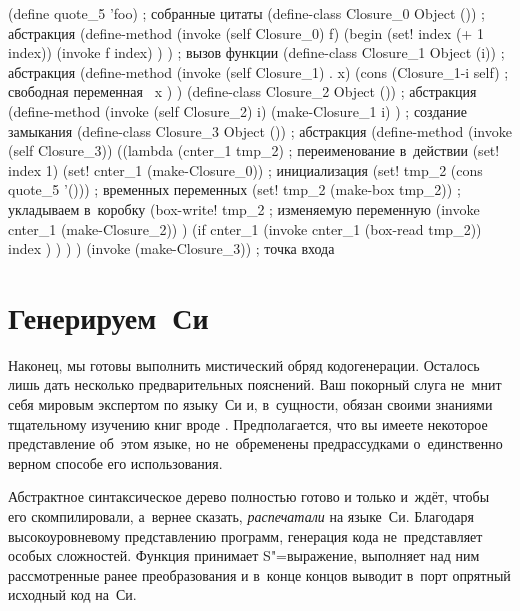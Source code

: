 \begin{code:lisp}
(define quote_5 'foo)                    ; собранные цитаты
(define-class Closure_0 Object ())       ; абстракция 
(define-method (invoke (self Closure_0) f)
  (begin
    (set! index (+ 1 index))
    (invoke f index) ) )                 ; вызов функции
(define-class Closure_1 Object (i))      ; абстракция 
(define-method (invoke (self Closure_1) . x)
  (cons (Closure_1-i self)               ; свободная переменная~
        x ) )
(define-class Closure_2 Object ())       ; абстракция 
(define-method (invoke (self Closure_2) i)
  (make-Closure_1 i) )                   ; создание замыкания
(define-class Closure_3 Object ())       ; абстракция 
(define-method (invoke (self Closure_3))
  ((lambda (cnter_1 tmp_2)               ; переименование в~действии
     (set! index 1)
     (set! cnter_1 (make-Closure_0))     ; инициализация
     (set! tmp_2 (cons quote_5 '()))     ; \quad временных переменных
     (set! tmp_2 (make-box tmp_2))       ; укладываем в~коробку
     (box-write! tmp_2                   ; \quad изменяемую переменную
                 (invoke cnter_1 (make-Closure_2)) )
     (if cnter_1
         (invoke cnter_1 (box-read tmp_2))
         index ) ) ) )
(invoke (make-Closure_3))                ; точка входа
\end{code:lisp}


\section{Генерируем~Си}\label{cc/sect:gen}

Наконец, мы готовы выполнить мистический обряд кодогенерации. Осталось лишь
дать несколько предварительных пояснений. Ваш покорный слуга не~мнит себя
мировым экспертом по языку~Си и, в~сущности, обязан своими знаниями тщательному
изучению книг вроде \cite{iso90,hs91,cek+89}. Предполагается, что вы имеете
некоторое представление об~этом языке, но не~обременены предрассудками
о~единственно верном способе его использования.

Абстрактное синтаксическое дерево полностью готово и только и~ждёт, чтобы его 
скомпилировали, а~вернее сказать, \emph{распечатали} на языке~Си. Благодаря
высокоуровневому представлению программ, генерация кода не~представляет особых
сложностей. Функция  принимает S"=выражение, выполняет над ним
рассмотренные ранее преобразования и в~конце концов выводит в~порт 
опрятный исходный код на~Си.


